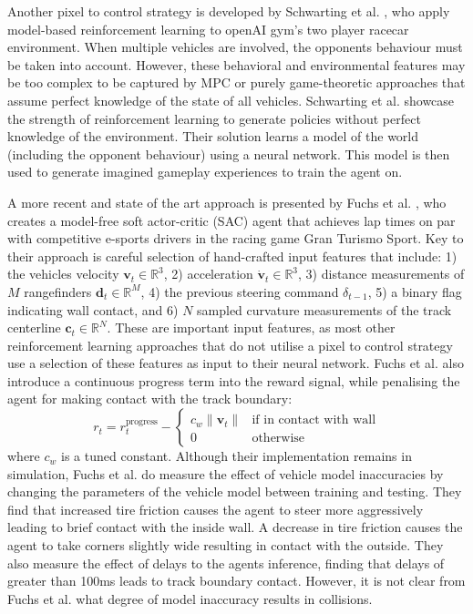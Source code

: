 Another pixel to control strategy is developed by Schwarting et al. \cite{Schwarting2021}, who apply model-based reinforcement learning to openAI gym's two player racecar environment.
When multiple vehicles are involved, the opponents behaviour must be taken into account.
However, these behavioral and environmental features may be too complex to be captured by MPC or purely game-theoretic approaches that assume perfect knowledge of the state of all vehicles.
Schwarting et al. \cite{Schwarting2021} showcase the strength of reinforcement learning to generate policies without perfect knowledge of the environment.
Their solution learns a model of the world (including the opponent behaviour) using a neural network.
This model is then used to generate imagined gameplay experiences to train the agent on.


A more recent and state of the art approach is presented by Fuchs et al. \cite{Fuchs2021}, who creates a model-free soft actor-critic (SAC) agent that achieves lap times on par with competitive e-sports drivers in the racing game Gran Turismo Sport.
Key to their approach is careful selection of hand-crafted input features that include: 1) the vehicles velocity $\pmb{v}_t \in \mathbb{R}^3$, 2) acceleration $\pmb{\dot{v}}_t \in \mathbb{R}^3$, 3) distance measurements of $M$ rangefinders $\pmb{d}_t \in \mathbb{R}^M$, 4) the previous steering command $\delta_{t-1}$, 5) a binary flag indicating wall contact, and 6) $N$ sampled curvature measurements of the track centerline $\pmb{c}_t \in \mathbb{R}^N$.
These are important input features, as most other reinforcement learning approaches that do not utilise a pixel to control strategy use a selection of these features as input to their neural network.
Fuchs et al. \cite{Fuchs2021} also introduce a continuous progress term into the reward signal, while penalising the agent for making contact with the track boundary:
\begin{equation}
    r_t = r_{t}^{\text{progress}} - 
    \begin{cases}
    c_w \| \pmb{v}_t \| & \text{if in contact with wall} \\
    0 & \text{otherwise}
    \end{cases}
\end{equation}
where $c_w$ is a tuned constant.
Although their implementation remains in simulation, Fuchs et al. \cite{Fuchs2021} do measure the effect of vehicle model inaccuracies by changing the parameters of the vehicle model between training and testing. They find that increased tire friction causes the agent to steer more aggressively leading to brief contact with the inside wall. A decrease in tire friction causes the agent to take corners slightly wide resulting in contact with the outside.
They also measure the effect of delays to the agents inference, finding that delays of greater than 100ms leads to track boundary contact. 
However, it is not clear from Fuchs et al. \cite{Fuchs2021} what degree of model inaccuracy results in collisions.


